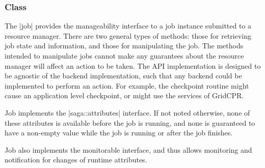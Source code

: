  
  \subsubsection*{Class }
 
    The |job| provides the manageability interface to a job
    instance submitted to a resource manager. There are two
    general types of methods: those for retrieving job state and
    information, and those for manipulating the job.  The
    methods intended to manipulate jobs cannot make any
    guarantees about  the resource manager will
    affect an action to be taken.  The API
    implementation is designed to be agnostic of the backend
    implementation, such that any backend could be
    implemented to perform an action. For example, the
    checkpoint routine might cause an application level
    checkpoint, or might use the services of GridCPR.
 
    Job implements the |saga::attributes| interface.  If not noted
    otherwise, none of these attributes is available before the
    job is running, and none is guaranteed to have a non-empty
    value while the job is running or after the job finishes.
 
    Job also implements the monitorable interface, and thus
    allows monitoring and notification for changes of
    runtime attributes.
 
